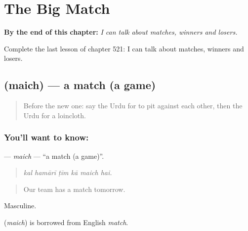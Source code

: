
\chapter{The Big Match}
\label{ch:ur-the-big-match}

\begin{chapteropening}
\textbf{By the end of this chapter:} \emph{I can talk about matches, winners and losers.}

Complete the last lesson of chapter 521: I can talk about matches, winners and losers.
\end{chapteropening}

\section[\texorpdfstring{\ur{میچ} (maich)}{میچ (maich)}]{ (maich) — a match (a game)}

\label{lesson:UR-C521-maich}



\begin{quote}
Before the new one: say the Urdu for to pit against each other, then the Urdu for a loincloth.
\end{quote}

\subsection*{You'll want to know: }
\textbf{} — \emph{maich} — \textquotedblleft{}a match (a game)\textquotedblright{}.

\begin{quote}
     
\end{quote}

\begin{quote}
\emph{kal hamārī ṭīm kā maich hai.}
\end{quote}

\begin{quote}
Our team has a match tomorrow.
\end{quote}

Masculine.

\begin{cousinweb}
\textbf{} (\emph{maich}) is borrowed from English \emph{match}.
\end{cousinweb}


